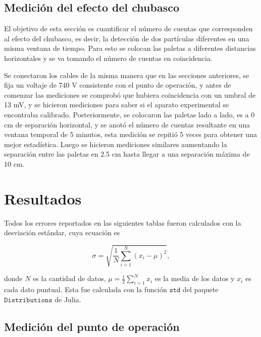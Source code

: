 \documentclass[a4paper,10pt]{article}
\numberwithin{equation}{section}
\begin{document}
\subsection{Medición del efecto del chubasco}
\label{ss:medicionchubasco}

El objetivo de esta sección es cuantificar el número de cuentas que corresponden 
al efecto del chubasco, es decir, la detección de dos partículas diferentes en una misma 
ventana de tiempo. Para esto se colocan las paletas a diferentes distancias horizontales 
y se va tomando el número de cuentas en coincidencia.

\vspace{.3cm}

Se conectaron los cables de la misma manera que en las secciones anteriores, se 
fija un voltaje de 740 V consistente con el punto de  operación, y antes de comenzar 
las mediciones se comprobó que hubiera coincidencia con un umbral de 13 mV, y se 
hicieron mediciones para saber si el aparato experimental se encontraba calibrado. 
Posteriormente, se colocaron las paletas lado a lado, es a 0 cm de separación horizontal, 
y se anotó el número de cuentas resultante en una ventana temporal de 5 minutos, 
esta medición se repitió 5 veces para obtener una mejor estadística. Luego se 
hicieron mediciones similares aumentando la separación entre las paletas en 2.5 cm
hasta llegar a una separación máxima de 10 cm.

\newpage

\section{Resultados}
\label{s:resultados}

Todos los errores reportados en las siguientes tablas fueron calculados con la desviación 
estándar, cuya ecuación es 

\begin{equation}
 \sigma = \sqrt{\frac{1}{N}\sum_{i=1}^N (x_i - \mu)^2},
\end{equation}

donde $N$ es la cantidad de datos, $\mu = \frac{1}{2} \sum_{i=1}^N x_i$ es la 
media de los datos y $x_i$ es cada dato puntual. Esta fue calculada con la 
función \href{http://distributionsjl.readthedocs.org/en/latest/univariate.html?highlight=std\#std}{$\texttt{std}$} 
del paquete $\texttt{Distributions}$ de Julia.


\subsection{Medición del punto de operación}
\end{document}
